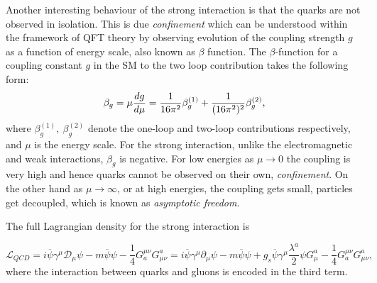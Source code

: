 Another interesting behaviour of the strong interaction is that the quarks are not observed in isolation. This is due \textit{confinement} which can be understood within the framework of \gls{QFT} theory by observing evolution of the coupling strength $g$ as a function of energy scale, also known as $\beta$ function.
The $\beta$-function for a coupling constant $g$ in the \gls{SM} to the two loop contribution takes the following form:
\begin{equation}
\beta_g = \mu {{d g}\over d \mu} = {1\over16\pi^2} \beta_g^{(1)}
+ {1\over(16\pi^2)^2} \beta_g^{(2)},
\end{equation}
where $\beta_g^{(1)},~ \beta_g^{(2)}$ denote the one-loop and two-loop
contributions respectively, and $\mu$ is the energy scale. For the strong interaction, unlike the electromagnetic and weak interactions, $\beta_g$ is negative. For low energies as $\mu \rightarrow 0$ the coupling is very high and hence quarks cannot be observed on their own, \textit{confinement}. On the other hand as $\mu \rightarrow \infty$, or at high energies, the coupling gets small, particles get decoupled, which is known as \textit{asymptotic freedom}. 

The full Lagrangian density for the strong interaction is

\begin{equation}
	\mathcal{L}_{QCD} = i\overline{\psi}\gamma^{\mu}\mathcal{D}_{\mu}\psi - m\overline{\psi}\psi -\frac{1}{4} G_{a}^{\mu\nu}G^{a}_{\mu\nu} = i\overline{\psi}\gamma^{\mu}\partial_{\mu}\psi - m\overline{\psi}\psi + g_{s}\overline{\psi}\gamma^{\mu}\frac{\lambda^{a}}{2}\psi G^{a}_{\mu} -\frac{1}{4} G_{a}^{\mu\nu}G^{a}_{\mu\nu},
\label{eq:lag_fourth}
\end{equation}
where the interaction between quarks and gluons is encoded in the third term.


